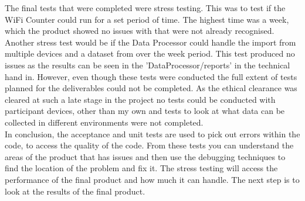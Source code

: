 \documentclass{report}
\begin{document}
The final tests that were completed were stress testing. This was to test if the WiFi Counter could run for a set period of time. The highest time was a week, which the product showed no issues with that were not already recognised. Another stress test would be if the Data Processor could handle the import from multiple devices and a dataset from over the week period. This test produced no issues as the results can be seen in the 'DataProcessor/reports' in the technical hand in. However, even though these tests were conducted the full extent of tests planned for the deliverables could not be completed. As the ethical clearance was cleared at such a late stage in the project no tests could be conducted with participant devices, other than my own and tests to look at what data can be collected in different environments were not completed.\\ \newline
In conclusion, the acceptance and unit tests are used to pick out errors within the code, to access the quality of the code. From these tests you can understand the areas of the product that has issues and then use the debugging techniques to find the location of the problem and fix it. The stress testing will access the performance of the final product and how much it can handle. The next step is to look at the results of the final product.
\clearpage
\end{document}
